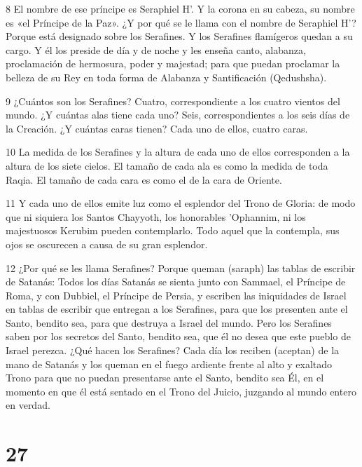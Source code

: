 \par 8 El nombre de ese príncipe es Seraphiel H'. Y la corona en su cabeza, su nombre es «el Príncipe de la Paz». ¿Y por qué se le llama con el nombre de Seraphiel H'? Porque está designado sobre los Serafines. Y los Serafines flamígeros quedan a su cargo. Y él los preside de día y de noche y les enseña canto, alabanza, proclamación de hermosura, poder y majestad; para que puedan proclamar la belleza de su Rey en toda forma de Alabanza y Santificación (Qedushsha).

\par 9 ¿Cuántos son los Serafines? Cuatro, correspondiente a los cuatro vientos del mundo. ¿Y cuántas alas tiene cada uno? Seis, correspondientes a los seis días de la Creación. ¿Y cuántas caras tienen? Cada uno de ellos, cuatro caras.

\par 10 La medida de los Serafines y la altura de cada uno de ellos corresponden a la altura de los siete cielos. El tamaño de cada ala es como la medida de toda Raqia. El tamaño de cada cara es como el de la cara de Oriente.

\par 11 Y cada uno de ellos emite luz como el esplendor del Trono de Gloria: de modo que ni siquiera los Santos Chayyoth, los honorables 'Ophannim, ni los majestuosos Kerubim pueden contemplarlo. Todo aquel que la contempla, sus ojos se oscurecen a causa de su gran esplendor.

\par 12 ¿Por qué se les llama Serafines? Porque queman (saraph) las tablas de escribir de Satanás: Todos los días Satanás se sienta junto con Sammael, el Príncipe de Roma, y ​​con Dubbiel, el Príncipe de Persia, y escriben las iniquidades de Israel en tablas de escribir que entregan a los Serafines, para que los presenten ante el Santo, bendito sea, para que destruya a Israel del mundo. Pero los Serafines saben por los secretos del Santo, bendito sea, que él no desea que este pueblo de Israel perezca. ¿Qué hacen los Serafines? Cada día los reciben (aceptan) de la mano de Satanás y los queman en el fuego ardiente frente al alto y exaltado Trono para que no puedan presentarse ante el Santo, bendito sea Él, en el momento en que él está sentado en el Trono del Juicio, juzgando al mundo entero en verdad.



\chapter{27}

